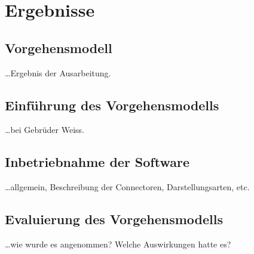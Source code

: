 \chapter{Ergebnisse}

\section{Vorgehensmodell}

\ldots Ergebnis der Ausarbeitung.

\section{Einführung des Vorgehensmodells}

\ldots bei Gebrüder Weiss.

\section{Inbetriebnahme der Software}

\ldots allgemein, Beschreibung der Connectoren, Darstellungsarten, etc.

\section{Evaluierung des Vorgehensmodells}

\ldots wie wurde es angenommen? Welche Auswirkungen hatte es?
